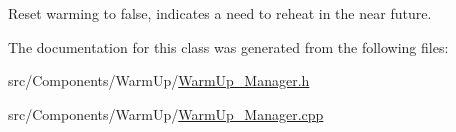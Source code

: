 Reset warming to false, indicates a need to reheat in the near future. 



The documentation for this class was generated from the following files\+:\begin{DoxyCompactItemize}
\item 
src/\+Components/\+Warm\+Up/\hyperlink{_warm_up___manager_8h}{Warm\+Up\+\_\+\+Manager.\+h}\item 
src/\+Components/\+Warm\+Up/\hyperlink{_warm_up___manager_8cpp}{Warm\+Up\+\_\+\+Manager.\+cpp}\end{DoxyCompactItemize}
